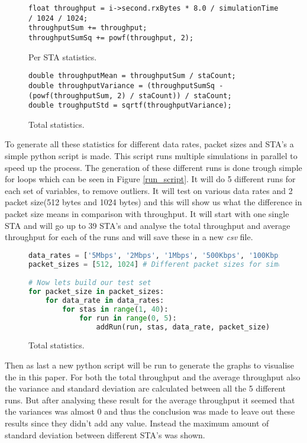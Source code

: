 \documentclass[]{article}
\begin{document}
\begin{figure}[H]
\begin{lstlisting}[frame=bt]
float throughput = i->second.rxBytes * 8.0 / simulationTime / 1024 / 1024;
throughputSum += throughput;
throughputSumSq += powf(throughput, 2);
\end{lstlisting}
\caption{Per STA statistics.\label{fig:sta_stats}}
\end{figure}

\begin{figure}[H]
\begin{lstlisting}[frame=bt]
double throughputMean = throughputSum / staCount;
double throughputVariance = (throughputSumSq - (powf(throughputSum, 2) / staCount)) / staCount;
double troughputStd = sqrtf(throughputVariance);
\end{lstlisting}
\caption{Total statistics.\label{fig:tot_stats}}
\end{figure}

To generate all these statistics for different data rates, packet sizes and STA's a simple python script is made.
This script runs multiple simulations in parallel to speed up the process.
The generation of these different runs is done trough simple for loops which can be seen in Figure \ref{run_script}.
It will do 5 different runs for each set of variables, to remove outliers.
It will test on various data rates and 2 packet size(512 bytes and 1024 bytes) and this will show us what the difference in packet size means in comparison with throughput.
It will start with one single STA and will go up to 39 STA's and analyse the total throughput and average throughput for each of the runs and will save these in a new \textit{csv} file.

\begin{figure}[H]
\begin{lstlisting}[frame=bt, language=Python]
data_rates = ['5Mbps', '2Mbps', '1Mbps', '500Kbps', '100Kbps']	# Different data rates for simulation
packet_sizes = [512, 1024] # Different packet sizes for simulation

# Now lets build our test set
for packet_size in packet_sizes:
	for data_rate in data_rates:
		for stas in range(1, 40):
			for run in range(0, 5):
				addRun(run, stas, data_rate, packet_size)
\end{lstlisting}
\caption{Total statistics.\label{fig:run_script}}
\end{figure}

Then as last a new python script will be run to generate the graphs to visualise the in this paper.
For both the total throughput and the average throughput also the variance and standard deviation are calculated between all the 5 different runs.
But after analysing these result for the average throughput it seemed that the variances was almost 0 and thus the conclusion was made to leave out these results since they didn't add any value.
Instead the maximum amount of standard deviation between different STA's was shown.
\end{document}
